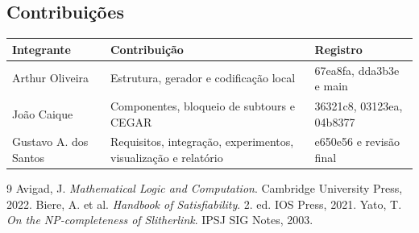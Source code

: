 \documentclass[11pt,a4paper]{article}
\begin{document}
\subsection{Contribuições}
\begin{center}
\small
\begin{tabular}{p{3.2cm}p{7.5cm}p{3.1cm}}
\toprule
Integrante & Contribuição & Registro \\
\midrule
Arthur Oliveira & Estrutura, gerador e codificação local & 67ea8fa, dda3b3e e main \\
João Caique & Componentes, bloqueio de subtours e CEGAR & 36321c8, 03123ea, 04b8377 \\
Gustavo A. dos Santos & Requisitos, integração, experimentos, visualização e relatório & e650e56 e revisão final \\
\bottomrule
\end{tabular}
\end{center}

\begin{thebibliography}{9}
 Avigad, J. \textit{Mathematical Logic and Computation}. Cambridge University Press, 2022.
 Biere, A. et al. \textit{Handbook of Satisfiability}. 2. ed. IOS Press, 2021.
 Yato, T. \textit{On the NP-completeness of Slitherlink}. IPSJ SIG Notes, 2003.
\end{thebibliography}
\end{document}
